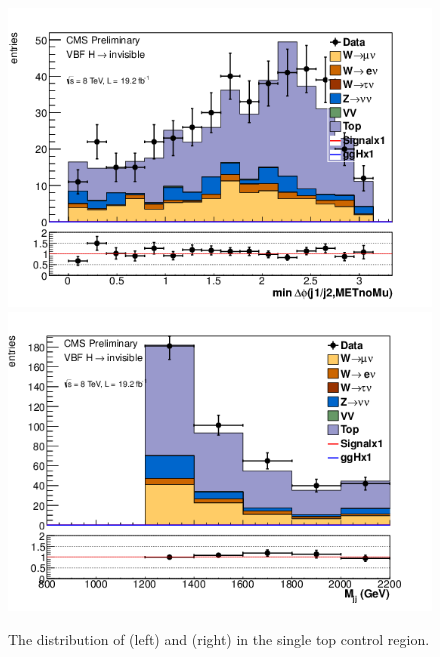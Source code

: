 \begin{figure}
  \includegraphics[width=.65\largefigwidth]{plots/parked/AN-14-243-figs/singletop/top_jetmetnomu_mindphi.png}
  \includegraphics[width=.65\largefigwidth]{plots/parked/AN-14-243-figs/singletop/top_dijet_M.png}
  \caption{The distribution of \jetmetdphileading (left) and \Mjj (right) in the single top control region.}
  \label{fig:parkedsingletopjetmetdphi}
\end{figure}

